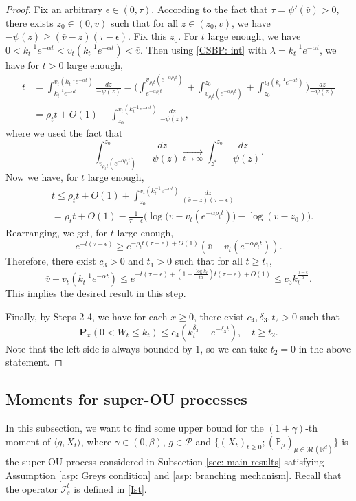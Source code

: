 \documentclass[12pt,a4paper]{amsart}
\theoremstyle{plain}
\theoremstyle{definition}
\numberwithin{equation}{section}
\begin{document}
\begin{proof}
Fix an arbitrary $\epsilon \in (0,\tau)$.
According to the fact that $\tau=\psi'(\bar v)>0$, there exists $z_0 \in (0,\bar v)$ such that for all $z\in (z_0, \bar v)$, we have $-\psi(z)\geq (\bar v - z)(\tau- \epsilon)$.     
Fix this $z_0$.
For $t$ large enough, we have $0<k_t^{-1}e^{-\alpha t} < v_t(k_t^{-1}e^{-\alpha t})< \bar v$.
Then using \eqref{CSBP: int} with $\lambda=k_t^{-1} e^{-\alpha t}$, we have for $t>0$ large enough,
\begin{align}
  t 
  & =\int^{v_t(k_t^{-1} e^{-\alpha t})}_{k_t^{-1} e^{-\alpha t}}\frac{dz}{-\psi(z)}
    = \Big(\int^{v_{\rho_t t}(e^{-\alpha \rho_t t})}_{e^{-\alpha \rho_t t}}  + \int^{z_0}_{v_{\rho_t t}(e^{-\alpha \rho_t t})} +\int^{v_t(k_t^{-1}e^{-\alpha  t})}_{z_0}\Big)\frac{dz}{-\psi(z)} \\
  & = \rho_t t + O(1) +\int^{v_t(k_t^{-1}e^{-\alpha t})}_{z_0} \frac{dz}{-\psi(z)},
\end{align}
where we used the fact that
\[
  \int_{v_{\rho_t t}(e^{-\alpha \rho_tt})}^{z_0} \frac{dz}{-\psi(z)} 
  \xrightarrow[t\to \infty] {} \int_{z^*}^{z_0} \frac{dz}{-\psi(z)}.
\]
Now we have, for $t$ large enough,
\begin{align}
  & t 
    \leq  \rho_t t + O(1) + \int_{z_0}^{v_t(k_t^{-1}e^{-\alpha t})} \frac{dz}{(\bar v-z)(\tau - \epsilon)} \\
  & =  \rho_t t +O(1)- \frac{1}{\tau-\epsilon}\Big( \log \big(\bar v-v_t(e^{-\alpha \rho_t t})\big) - \log(\bar v-z_0)\Big).
\end{align}
Rearranging, we get, for $t$ large enough,
\[
  e^{-t(\tau - \epsilon)} 
  \geq e^{-\rho_t t(\tau - \epsilon)+O(1)}(\bar v - v_t(e^{-\alpha \rho_t t})).
\]
Therefore, there exist $c_3>0$ and $t_1>0$ such that for all $t\geq t_1$,
\[
  \bar v - v_t(k_t^{-1} e^{-\alpha t}) 
  \leq e^{-t(\tau -\epsilon)+ (1+\frac{\log k_t}{t\alpha})t(\tau - \epsilon)+O(1)}
  \leq c_3k_t^{\frac{\tau - \epsilon}{\alpha}}.
\]
This implies the desired result in this step.

Finally, by Steps 2-4, we have for each $x\geq 0$, there exist $c_4, \delta_3, t_2 > 0$ such that
\[
  \mathbf P_{x}(0< W_t\leq k_t) 
  \leq c_4(k_t^{\delta_3}+e^{-\delta_3 t})
  , \quad t\geq t_2.
\]
Note that the left side is always bounded by $1$, so we can take $t_2 =0$ in the above statement.
\end{proof}

\subsection{Moments for super-OU processes}
\label{sec: Moments for super-OU processes}
In this subsection,  we want to find some upper bound for the $(1+\gamma)$-th moment of $\langle g ,X_t \rangle$, where $\gamma \in (0,\beta)$, $g\in \mathcal P$ and $\{(X_t)_{t\geq 0}; (\mathbb P_\mu)_{\mu \in \mathcal M(\mathbb R^d)}\}$ is the super OU process considered in Subsection \ref{sec: main results} satisfying Assumption \ref{asp: Greys condition} and \ref{asp: branching mechanism}.
Recall that the operator $\mathcal{I}^t_s$ is defined in \eqref{Ist}.
\end{document}
